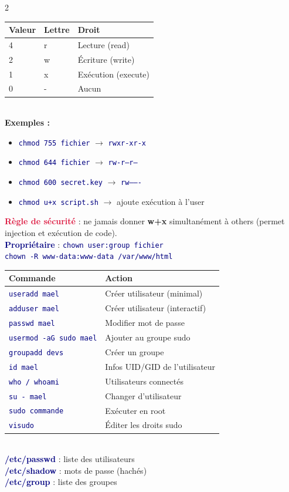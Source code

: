 \documentclass[a4paper,10pt]{article}
\newcommand{\key}[1]{\textbf{\textcolor{navy}{#1}}}
\newcommand{\warn}[1]{\textbf{\textcolor{crimson}{#1}}}
\newcommand{\cmd}[1]{\texttt{\textcolor{navy}{#1}}}
\begin{document}
\begin{multicols}{2}
\begin{tcolorbox}[basebox, colframe=orange, title=3. Gestion des permissions (chmod)]
\begin{tabular}{lll}
\toprule
\textbf{Valeur} & \textbf{Lettre} & \textbf{Droit} \\
\midrule
4 & r & Lecture (read) \\
2 & w & Écriture (write) \\
1 & x & Exécution (execute) \\
0 & - & Aucun \\
\bottomrule
\end{tabular}
\vspace{4pt}\\
\textbf{Exemples :}
\begin{itemize}
  \item \cmd{chmod 755 fichier} $\to$ \cmd{rwxr-xr-x}
  \item \cmd{chmod 644 fichier} $\to$ \cmd{rw-r--r--}
  \item \cmd{chmod 600 secret.key} $\to$ \cmd{rw-------}
  \item \cmd{chmod u+x script.sh} $\to$ ajoute exécution à l'user
\end{itemize}
\vspace{4pt}
\warn{Règle de sécurité} : ne jamais donner \textbf{w+x} simultanément à others (permet injection et exécution de code).\\[4pt]
\key{Propriétaire} : \cmd{chown user:group fichier}\\
\cmd{chown -R www-data:www-data /var/www/html}
\end{tcolorbox}

\begin{tcolorbox}[basebox, colframe=teal, title=4. Gestion des utilisateurs et groupes]
\begin{tabular}{ll}
\toprule
\textbf{Commande} & \textbf{Action} \\
\midrule
\cmd{useradd mael} & Créer utilisateur (minimal) \\
\cmd{adduser mael} & Créer utilisateur (interactif) \\
\cmd{passwd mael} & Modifier mot de passe \\
\cmd{usermod -aG sudo mael} & Ajouter au groupe sudo \\
\cmd{groupadd devs} & Créer un groupe \\
\cmd{id mael} & Infos UID/GID de l'utilisateur \\
\cmd{who / whoami} & Utilisateurs connectés \\
\cmd{su - mael} & Changer d'utilisateur \\
\cmd{sudo commande} & Exécuter en root \\
\cmd{visudo} & Éditer les droits sudo \\
\bottomrule
\end{tabular}
\vspace{4pt}\\
\key{/etc/passwd} : liste des utilisateurs \\
\key{/etc/shadow} : mots de passe (hachés) \\
\key{/etc/group} : liste des groupes
\end{tcolorbox}


\end{multicols}
\end{document}
